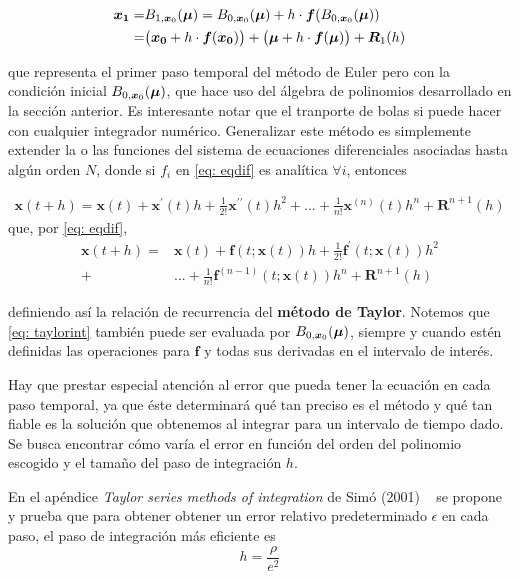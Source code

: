 \begin{align*}
 \bm{x_1} =&  B_{1,\bm{x}_0}(\bm{\mu}) =  B_{0,\bm{x}_0}(\bm{\mu}) + h\cdot\bm{f}( B_{0,\bm{x}_0}(\bm{\mu})) \\ 
 =& \big( \bm{x_0} + h\cdot \bm{f}(\bm{x_0}) \big) +  \big( \bm{\mu} + h\cdot \bm{f}(\bm{\mu}) \big) + \bm{R}_1(h)
\end{align*}

que representa el primer paso temporal del método de Euler pero con la condición inicial $B_{0,\bm{x}_0}(\bm{\mu})$, que hace uso del álgebra de polinomios desarrollado en la sección anterior. Es interesante notar que el tranporte de bolas si puede hacer con cualquier integrador numérico. Generalizar este método es simplemente extender la o las funciones del sistema de ecuaciones diferenciales asociadas hasta algún orden $N$, donde si $f_i$ en \ref{eq: eqdif} es analítica $\forall i$, entonces 

\begin{align}
 \bm{x}(t+h) = \bm{x}(t) + \bm{x}^{\prime}(t)h + \frac{1}{2!}\bm{x}^{\prime\prime}(t)h^2 + ... + \frac{1}{n!}\bm{x}^{(n)}(t)h^n + \bm{R}^{n+1}(h)
\end{align}
que, por \ref{eq: eqdif},
\begin{align}
 \bm{x}(t+h) =& \bm{x}(t) + \bm{f}(t;\bm{x}(t))h + \frac{1}{2!}\bm{f}^\prime(t;\bm{x}(t))h^2 \\ 
 +& ... + \frac{1}{n!}\bm{f}^{(n-1)}(t;\bm{x}(t))h^n + \bm{R}^{n+1}(h)
 \label{eq: taylorint}
\end{align}

definiendo así la relación de recurrencia del \textbf{método de Taylor}. Notemos que \ref{eq: taylorint} también puede ser evaluada por $B_{0,\bm{x}_0}(\bm{\mu})$, siempre y cuando estén definidas las operaciones para $\bm{f}$ y todas sus derivadas en el intervalo de interés.

Hay que prestar especial atención al error que pueda tener la ecuación en cada paso temporal, ya que éste determinará qué tan preciso es el método y qué tan fiable es la solución que obtenemos al integrar para un intervalo de tiempo dado. Se busca encontrar cómo varía el error en función del orden del polinomio escogido y el tamaño del paso de integración $h$.

En el apéndice \textit{Taylor series methods of integration} de Simó (2001) ~\cite{Simo2001} se propone y prueba que para obtener obtener un error relativo predeterminado $\epsilon$ en cada paso, el paso de integración más eficiente es 
\begin{equation}
 h = \frac{ \rho}{e^{2}}
\end{equation}

